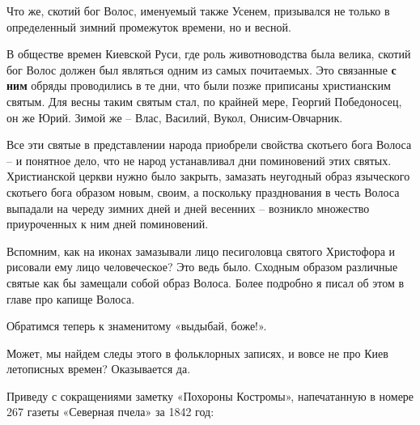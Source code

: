    Что же, скотий бог Волос, именуемый также Усенем, призывался не только в определенный зимний промежуток времени, но и весной. 

   В обществе времен Киевской Руси, где роль животноводства была велика, скотий бог Волос должен был являться одним из самых почитаемых. Это связанные \textbf{с ним} обряды проводились в те дни, что были позже приписаны христианским святым. Для весны таким святым стал, по крайней мере, Георгий Победоносец, он же Юрий. Зимой же – Влас, Василий, Вукол, Онисим-Овчарник.

   Все эти святые в представлении народа приобрели свойства скотьего бога Волоса – и понятное дело, что не народ устанавливал дни поминовений этих святых. Христианской церкви нужно было закрыть, замазать неугодный образ языческого скотьего бога образом новым, своим, а поскольку празднования в честь Волоса выпадали на череду зимних дней и дней весенних – возникло множество приуроченных к ним дней поминовений.

    Вспомним, как на иконах замазывали лицо песиголовца святого Христофора и рисовали ему лицо человеческое? Это ведь было. Сходным образом различные святые как бы замещали собой образ Волоса. Более подробно я писал об этом в главе про капище Волоса.

   Обратимся теперь к знаменитому «выдыбай, боже!».

   Может, мы найдем следы этого в фольклорных записях, и вовсе не про Киев летописных времен? Оказывается да.

   Приведу с сокращениями заметку «Похороны Костромы», напечатанную в номере 267 газеты «Северная пчела» за 1842 год:

